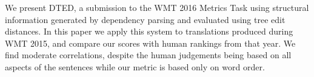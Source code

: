 We present DTED, a submission to the WMT 2016 Metrics Task using structural information generated by dependency parsing and evaluated using tree edit distances. In this paper we apply this system to translations produced during WMT 2015, and compare our scores with human rankings from that year. We find moderate correlations, despite the human judgements being based on all aspects of the sentences while our metric is based only on word order.
